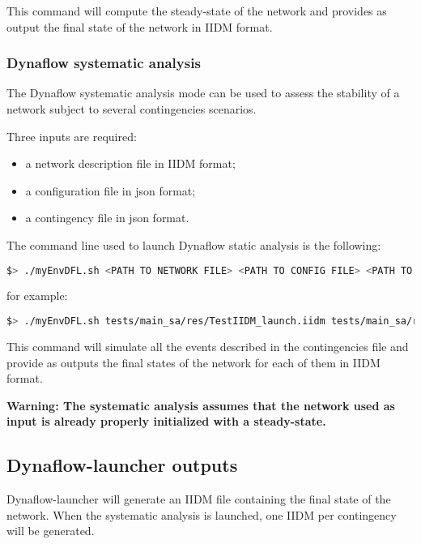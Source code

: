 \documentclass[a4paper, 12pt]{report}
\begin{document}
This command will compute the steady-state of the network and provides as output the final state of the network in IIDM format.

\subsubsection{Dynaflow systematic analysis}

The Dynaflow systematic analysis mode can be used to assess the stability of a network subject to several contingencies scenarios.

Three inputs are required:
\begin{itemize}
  \item a network description file in IIDM format;
  \item a configuration file in json format;
  \item a contingency file in json format.
\end{itemize}

The command line used to launch Dynaflow static analysis is the following:

\begin{lstlisting}[language=bash, breaklines=true, breakatwhitespace=false]
$> ./myEnvDFL.sh <PATH TO NETWORK FILE> <PATH TO CONFIG FILE> <PATH TO CONTINGENCIES FILE>
\end{lstlisting}

for example:

\begin{lstlisting}[language=bash, breaklines=true, breakatwhitespace=false]
$> ./myEnvDFL.sh tests/main_sa/res/TestIIDM_launch.iidm tests/main_sa/res/config_launch.json tests/main_sa/res/contingencies_launch.json
\end{lstlisting}

This command will simulate all the events described in the contingencies file and provide as outputs the final states of the network for each of them in IIDM format.

\textbf{Warning: The systematic analysis assumes that the network used as input is already properly initialized with a steady-state.}

\subsection[Dynaflow-launcher outputs]{Dynaflow-launcher outputs}

Dynaflow-launcher will generate an IIDM file containing the final state of the network. When the systematic analysis is launched, one IIDM per contingency will be generated.
\end{document}
